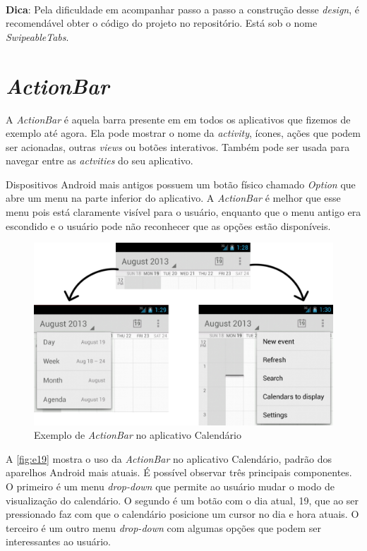 \documentclass[a4paper,12pt,brazil,oneside]{book}
\begin{document}
\begin{singlespace}
	\begin{framed}
	\paragraph{}\textbf{Dica}: Pela dificuldade em acompanhar passo a passo a construção desse \emph{design}, é recomendável obter o código do projeto no repositório. Está sob o nome 		\emph{SwipeableTabs}.
	\textit{}
	\end{framed}
	
\section{\emph{ActionBar}}

	A \emph{ActionBar} é aquela barra presente em em todos os aplicativos que fizemos de exemplo até agora. Ela pode mostrar o nome da \emph{activity}, ícones, ações que podem ser acionadas, outras \emph{views} ou botões interativos. Também pode ser usada para navegar entre as \emph{actvities} do seu aplicativo.
	
	Dispositivos Android mais antigos possuem um botão físico chamado \emph{Option} que abre um menu na parte inferior do aplicativo. A \emph{ActionBar} é melhor que esse menu pois está claramente visível para o usuário, enquanto que o menu antigo era escondido e o usuário pode não reconhecer que as opções estão disponíveis.
	
	\begin{figure}[H]
	  \centering
	  \includegraphics[width=.8\textwidth]{figuras/design/actionbar-ex.jpg}
	  \caption{Exemplo de \emph{ActionBar} no aplicativo Calendário}
	  \label{fig:e19}
	\end{figure}
	
	A \autoref{fig:e19} mostra o uso da \emph{ActionBar} no aplicativo Calendário, padrão dos aparelhos Android mais atuais. É possível observar três principais componentes. O primeiro é um menu \emph{drop-down} que permite ao usuário mudar o modo de visualização do calendário. O segundo é um botão com o dia atual, 19, que ao ser pressionado faz com que o calendário posicione um cursor no dia e hora atuais. O terceiro é um outro menu \emph{drop-down} com algumas opções que podem ser interessantes ao usuário.
	

\end{singlespace}
\end{document}
